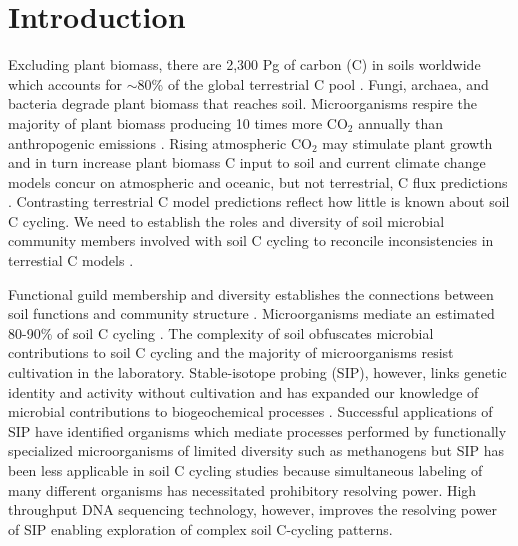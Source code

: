 \section{Introduction}
Excluding plant biomass, there are 2,300 Pg of carbon (C) in soils
worldwide which accounts for $\sim$80\% of the global terrestrial C pool
\citep{Amundson_2001,BATJES_1996}. Fungi, archaea, and bacteria degrade plant
biomass that reaches soil. Microorganisms respire the majority of plant biomass
producing 10 times more CO$_{2}$ annually than anthropogenic emissions
\citep{chapin2002principles}. Rising atmospheric CO$_{2}$ may stimulate
plant growth and in turn increase plant biomass C input to soil
\citep{Groenigen_2006} and current climate change models concur on atmospheric
and oceanic, but not terrestrial, C flux predictions
\citep{Friedlingstein_2006}. Contrasting terrestrial C model predictions
reflect how little is known about soil C cycling. We need to establish the
roles and diversity of soil microbial community members involved with soil
C cycling to reconcile inconsistencies in terrestial C models
\citep{Neff_2001,McGuire2010a}.

Functional guild membership and diversity establishes the connections between
soil functions and community structure \citep{O_Donnell_2002}. Microorganisms
mediate an estimated 80-90\% of soil C cycling
\citep{ColemanCrossley_1996,Nannipieri_2003}. The complexity of soil obfuscates
microbial contributions to soil C cycling and the majority of microorganisms
resist cultivation in the laboratory. Stable-isotope probing (SIP), however,
links genetic identity and activity without cultivation and has expanded our
knowledge of microbial contributions to biogeochemical processes
\citep{Chen_Murrell_2010}. Successful applications of SIP have identified
organisms which mediate processes performed by functionally specialized
microorganisms of limited diversity such as methanogens \citep{Lu_2005} but SIP
has been less applicable in soil C cycling studies because simultaneous
labeling of many different organisms has necessitated prohibitory resolving
power. High throughput DNA sequencing technology, however, improves
the resolving power of SIP enabling exploration of complex soil C-cycling
patterns.

